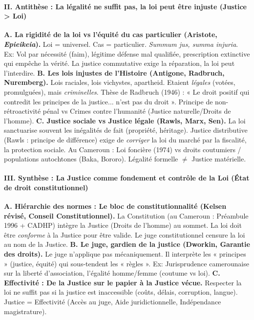 \documentclass[11pt]{article}
\newcommand{\cle}[1]{{\popxbold\color{popdark}#1}}
\begin{document}
\begin{exoresolu}
    \paragraph{II. Antithèse : La légalité ne suffit pas, la loi peut être injuste (Justice > Loi)}
    \textbf{A. La rigidité de la loi vs l'équité du cas particulier (Aristote, \emph{Epieikeia}).} Loi = universel. Cas = particulier. \emph{Summum jus, summa injuria}. Ex: Vol par nécessité (faim), légitime défense mal qualifiée, prescription extinctive qui empêche la vérité. La justice commutative exige la réparation, la loi peut l'interdire.
    \textbf{B. Les lois injustes de l'Histoire (Antigone, Radbruch, Nuremberg).} Lois raciales, lois vichystes, apartheid. Etaient \emph{légales} (votées, promulguées), mais \emph{criminelles}. Thèse de Radbruch (1946) : « Le droit positif qui contredit les principes de la justice... n'est pas du droit ». Principe de non-rétroactivité pénal vs Crimes contre l'humanité (Justice naturelle/Droits de l'homme).
    \textbf{C. Justice sociale vs Justice légale (Rawls, Marx, Sen).} La loi sanctuarise souvent les inégalités de fait (propriété, héritage). Justice distributive (Rawls : principe de différence) exige de \emph{corriger} la loi du marché par la fiscalité, la protection sociale. Au Cameroun : Loi foncière (1974) vs droits coutumiers / populations autochtones (Baka, Bororo). Légalité formelle $\neq$ Justice matérielle.
    \paragraph{III. Synthèse : La Justice comme fondement et contrôle de la Loi (État de droit constitutionnel)}
    \textbf{A. Hiérarchie des normes : Le bloc de constitutionnalité (Kelsen révisé, Conseil Constitutionnel).} La Constitution (au Cameroun : Préambule 1996 + CADHP) intègre la Justice (Droits de l'homme) au sommet. La loi doit être \emph{conforme} à la Justice pour être valide. Le juge constitutionnel censure la loi au nom de la Justice.
    \textbf{B. Le juge, gardien de la justice (Dworkin, Garantie des droits).} Le juge n'applique pas mécaniquement. Il interprète les « principes » (justice, équité) qui sous-tendent les « règles ». Ex: Jurisprudence camerounaise sur la liberté d'association, l'égalité homme/femme (coutume vs loi).
    \textbf{C. Effectivité : De la Justice sur le papier à la Justice vécue.} Respecter la loi ne suffit pas si la justice est inaccessible (coûts, délais, corruption, langue). Justice = \cle{Effectivité} (Accès au juge, Aide juridictionnelle, Indépendance magistrature).

\end{exoresolu}
\end{document}
